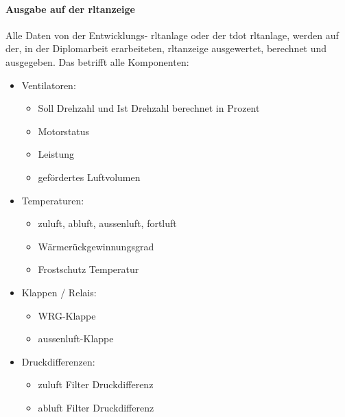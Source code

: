 \paragraph{Ausgabe auf der \ac{rltanzeige}}
Alle Daten von der Entwicklungs- \ac{rltanlage} oder der \gls{tdot} \ac{rltanlage}, werden auf der, in der Diplomarbeit erarbeiteten, \ac{rltanzeige} ausgewertet, berechnet und ausgegeben. 
Das betrifft alle Komponenten:
\begin{itemize}

	\item Ventilatoren: 
	\begin{itemize}
		\item Soll Drehzahl und Ist Drehzahl berechnet in Prozent
		\item Motorstatus
		\item Leistung 
		\item gefördertes Luftvolumen
	\end{itemize}

	\item Temperaturen:
	\begin{itemize}
		\item \gls{zuluft}, \gls{abluft}, \gls{aussenluft}, \gls{fortluft} 
		\item Wärmerückgewinnungsgrad
		\item Frostschutz Temperatur 
	\end{itemize}

	\item Klappen / Relais:
	\begin{itemize}
		\item WRG-Klappe
		\item \gls{aussenluft}-Klappe 
	\end{itemize}
	
	\item Druckdifferenzen:
	\begin{itemize}
		\item \gls{zuluft} Filter Druckdifferenz
		\item \gls{abluft} Filter Druckdifferenz
	\end{itemize}
\end{itemize}

\newpage
